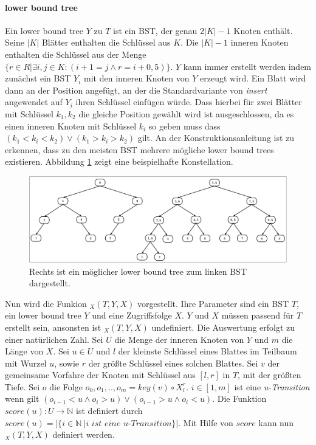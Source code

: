 \documentclass[a4paper,12pt]{article}
\begin{document}
\paragraph{lower bound tree} \label{wilberLowerBoundTree}
Ein lower bound tree $Y$ zu $T$ ist ein BST, der genau $2 \vert K\vert  - 1$ Knoten enthält. Seine $\vert K \vert$ Blätter enthalten die Schlüssel aus $K$. Die $\vert K \vert - 1$ inneren Knoten enthalten die Schlüssel aus der Menge $\{r \in R \vert \exists i,j \in K \colon \left( i + 1 = j \land r = i + 0,5\right)\}$. $Y$ kann immer erstellt werden indem zunächst ein BST $Y_i$ mit den inneren Knoten von $Y$ erzeugt wird. Ein Blatt wird dann an der Position angefügt, an der die Standardvariante von \textit{insert} angewendet auf $Y_i$ ihren Schlüssel einfügen würde. Dass hierbei für zwei Blätter mit Schlüssel $k_1, k_2$ die gleiche Position gewählt wird ist ausgeschlossen, da es einen inneren Knoten mit Schlüssel $k_i$ so geben muss dass $\left(k_1 < k_i < k_2\right) \lor \left(k_1 > k_i > k_2 \right)$ gilt. An der Konstruktionsanleitung ist zu erkennen, dass zu den meisten BST mehrere mögliche lower bound trees existieren. Abbildung \ref{fig:lowerBoundTree} zeigt eine beispielhafte Konstellation. \\



\begin{figure}[H]
	\centering
	\includegraphics[width=1\textwidth]{"Medien/DynOpt/lowerBoundTree"}
	\caption{Rechts ist ein möglicher lower bound tree zum linken BST dargestellt.  }
	\label{fig:lowerBoundTree}
\end{figure}

\noindent Nun wird die Funkion $_X(T, Y, X) $ vorgestellt. Ihre Parameter sind ein BST $T$, ein lower bound tree $Y$ und eine Zugriffsfolge $X$. $Y$ und $X$ müssen passend für $T$ erstellt sein, ansonsten ist $_X(T, Y, X) $ undefiniert. Die Auswertung erfolgt zu einer natürlichen Zahl. Sei $U$ die Menge der inneren Knoten von $Y$ und $m$ die Länge von $X$. Sei $u \in U$ und $l$ der kleinste Schlüssel eines Blattes im Teilbaum mit Wurzel $u$, sowie $r$ der größte Schlüssel eines solchen Blattes. Sei $v$ der gemeinsame Vorfahre der Knoten mit Schlüssel aus $\left[l, r\right]$  in $T$, mit der größten Tiefe. Sei $o$ die Folge $o_0, o_1,..,o_m =  \mathit{key}(v) \circ X^r_l$. $i \in \left[1,m\right]$ ist eine \textit{u-Transition} wenn gilt $\left( o_{i-1} < u \land o_i > u \right) \lor \left( o_{i-1} > u \land o_i < u \right)$. Die Funktion $\mathit{score}\left(u\right) \colon U \rightarrow \mathbb{N}$ ist definiert durch $\mathit{score}\left(u\right) = \vert\{i \in \mathbb{N}\ \vert \textit{i ist eine u-Transition}\} \vert$. Mit Hilfe von $\mathit{score}$ kann nun  $_X(T, Y, X) $ definiert werden.
\end{document}
